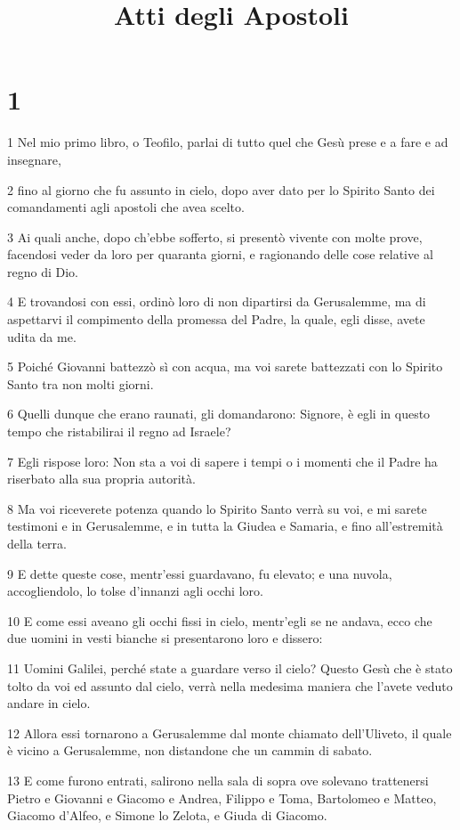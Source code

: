 

\title{Atti degli Apostoli}


\chapter{1}

\par 1 Nel mio primo libro, o Teofilo, parlai di tutto quel che Gesù prese e a fare e ad insegnare,
\par 2 fino al giorno che fu assunto in cielo, dopo aver dato per lo Spirito Santo dei comandamenti agli apostoli che avea scelto.
\par 3 Ai quali anche, dopo ch'ebbe sofferto, si presentò vivente con molte prove, facendosi veder da loro per quaranta giorni, e ragionando delle cose relative al regno di Dio.
\par 4 E trovandosi con essi, ordinò loro di non dipartirsi da Gerusalemme, ma di aspettarvi il compimento della promessa del Padre, la quale, egli disse, avete udita da me.
\par 5 Poiché Giovanni battezzò sì con acqua, ma voi sarete battezzati con lo Spirito Santo tra non molti giorni.
\par 6 Quelli dunque che erano raunati, gli domandarono: Signore, è egli in questo tempo che ristabilirai il regno ad Israele?
\par 7 Egli rispose loro: Non sta a voi di sapere i tempi o i momenti che il Padre ha riserbato alla sua propria autorità.
\par 8 Ma voi riceverete potenza quando lo Spirito Santo verrà su voi, e mi sarete testimoni e in Gerusalemme, e in tutta la Giudea e Samaria, e fino all'estremità della terra.
\par 9 E dette queste cose, mentr'essi guardavano, fu elevato; e una nuvola, accogliendolo, lo tolse d'innanzi agli occhi loro.
\par 10 E come essi aveano gli occhi fissi in cielo, mentr'egli se ne andava, ecco che due uomini in vesti bianche si presentarono loro e dissero:
\par 11 Uomini Galilei, perché state a guardare verso il cielo? Questo Gesù che è stato tolto da voi ed assunto dal cielo, verrà nella medesima maniera che l'avete veduto andare in cielo.
\par 12 Allora essi tornarono a Gerusalemme dal monte chiamato dell'Uliveto, il quale è vicino a Gerusalemme, non distandone che un cammin di sabato.
\par 13 E come furono entrati, salirono nella sala di sopra ove solevano trattenersi Pietro e Giovanni e Giacomo e Andrea, Filippo e Toma, Bartolomeo e Matteo, Giacomo d'Alfeo, e Simone lo Zelota, e Giuda di Giacomo.
